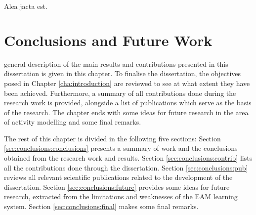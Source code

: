 

\begin{savequote}[50mm]
Alea jacta est.
\end{savequote}


\chapter{Conclusions and Future Work}
\label{cha:conclusions}

\ifpdf
    \graphicspath{{7_conclusions/figures/PDF/}{7_conclusions/figures/PNG/}{7_conclusions/figures/}}
\else
    \graphicspath{{7_conclusions/figures/EPS/}{7_conclusions/figures/}}
\fi

 general description of the main results and contributions presented in this dissertation is given in this chapter. To finalise the dissertation, the objectives posed in Chapter \ref{cha:introduction} are reviewed to see at what extent they have been achieved. Furthermore, a summary of all contributions done during the research work is provided, alongside a list of publications which serve as the basis of the research. The chapter ends with some ideas for future research in the area of activity modelling and some final remarks.

The rest of this chapter is divided in the following five sections: Section \ref{sec:conclusions:conclusions} presents a summary of work and the conclusions obtained from the research work and results. Section \ref{sec:conclusions:contrib} lists all the contributions done through the dissertation. Section \ref{sec:conclusions:pub} reviews all relevant scientific publications related to the development of the dissertation. Section \ref{sec:conclusions:future} provides some ideas for future research, extracted from the limitations and weaknesses of the EAM learning system. Section \ref{sec:conclusions:final} makes some final remarks.